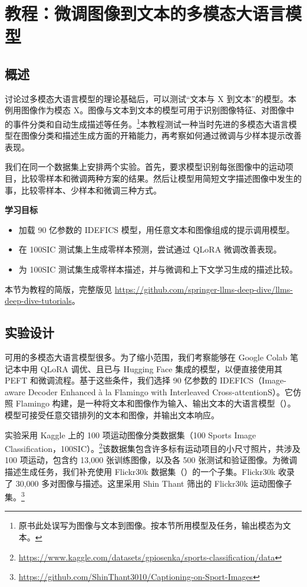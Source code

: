 \section{教程：微调图像到文本的多模态大语言模型}
\label{sec:ch09-tutorial}

\subsection{概述}
讨论过多模态大语言模型的理论基础后，可以测试“文本与 X 到文本”的模型。本例用图像作为模态 X。图像与文本到文本的模型可用于识别图像特征、对图像中的事件分类和自动生成描述等任务。\footnote{原书此处误写为图像与文本到图像。按本节所用模型及任务，输出模态为文本。}本教程测试一种当时先进的多模态大语言模型在图像分类和描述生成方面的开箱能力，再考察如何通过微调与少样本提示改善表现。

我们在同一个数据集上安排两个实验。首先，要求模型识别每张图像中的运动项目，比较零样本和微调两种方案的结果。然后让模型用简短文字描述图像中发生的事，比较零样本、少样本和微调三种方式。

\begin{keypoint}
\textbf{学习目标}
\begin{itemize}
\item 加载 90 亿参数的 IDEFICS 模型，用任意文本和图像组成的提示调用模型。
\item 在 100SIC 测试集上生成零样本预测，尝试通过 QLoRA 微调改善表现。
\item 为 100SIC 测试集生成零样本描述，并与微调和上下文学习生成的描述比较。
\end{itemize}
\end{keypoint}

本节为教程的简版，完整版见
\url{https://github.com/springer-llms-deep-dive/llms-deep-dive-tutorials}。

\subsection{实验设计}
可用的多模态大语言模型很多。为了缩小范围，我们考察能够在 Google Colab 笔记本中用 QLoRA 调优、且已与 Hugging Face 集成的模型，以便直接使用其 PEFT 和微调流程。基于这些条件，我们选择 90 亿参数的 IDEFICS（Image-aware Decoder Enhanced à la Flamingo with Interleaved Cross-attentionS）。它仿照 Flamingo 构建，是一种将文本和图像作为输入、输出文本的大语言模型（）。模型可接受任意交错排列的文本和图像，并输出文本响应。

实验采用 Kaggle 上的 100 项运动图像分类数据集（100 Sports Image Classification，100SIC）。\footnote{\url{https://www.kaggle.com/datasets/gpiosenka/sports-classification/data}}该数据集包含许多标有运动项目的小尺寸照片，共涉及 100 项运动，包含约 13,000 张训练图像，以及各 500 张测试和验证图像。为微调描述生成任务，我们补充使用 Flickr30k 数据集（）的一个子集。Flickr30k 收录了 30,000 多对图像与描述。这里采用 Shin Thant 筛出的 Flickr30k 运动图像子集。\footnote{\url{https://github.com/ShinThant3010/Captioning-on-Sport-Images}}

